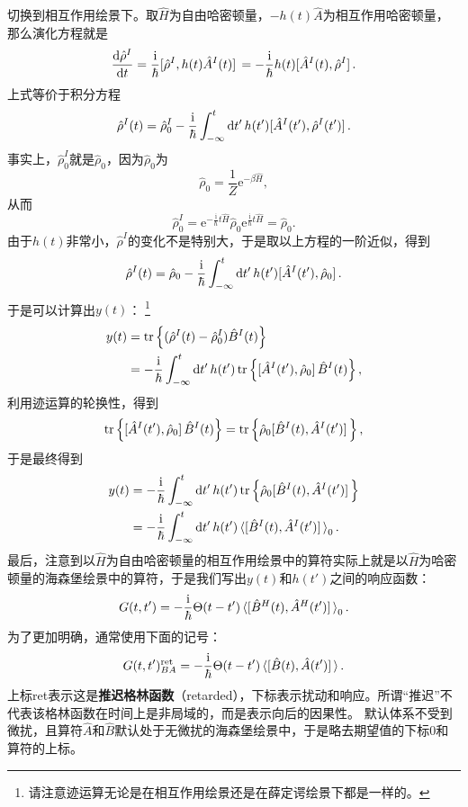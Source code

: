 \documentclass[hyperref, UTF8, a4paper]{ctexart}
\newcommand*{\ii}{\mathrm{i}}
\newcommand*{\ee}{\mathrm{e}}
\begin{document}
切换到相互作用绘景下。取$\hat{H}$为自由哈密顿量，$-h(t)\hat{A}$为相互作用哈密顿量，那么演化方程就是
\[
    \dv{\hat{\rho}^I}{t} = \frac{\ii}{\hbar} \comm*{\hat{\rho}^I}{h(t)\hat{A}^I(t)} = - \frac{\ii}{\hbar} h(t) \comm*{\hat{A}^I(t)}{\hat{\rho}^I}.
\]
上式等价于积分方程
\[
    \hat{\rho}^I(t) = \hat{\rho}_0^I - \frac{\ii}{\hbar}  \int_{-\infty}^t \dd{t'} h(t') \comm*{\hat{A}^I(t')}{\hat{\rho}^I(t')}.
\]
事实上，$\hat{\rho}_0^I$就是$\hat{\rho}_0$，因为$\hat{\rho}_0$为
\[
    \hat{\rho}_0 = \frac{1}{Z} \ee^{-\beta \hat{H}},
\]
从而
\[
    \hat{\rho}_0^I = \ee^{-\frac{\ii}{\hbar}t \hat{H}} \hat{\rho}_0 \ee^{\frac{\ii}{\hbar}t \hat{H}} = \hat{\rho}_0.
\]
由于$h(t)$非常小，$\hat{\rho}^I$的变化不是特别大，于是取以上方程的一阶近似，得到
\[
    \hat{\rho}^I(t) = \hat{\rho}_0 - \frac{\ii}{\hbar}  \int_{-\infty}^t \dd{t'} h(t') \comm*{\hat{A}^I(t')}{\hat{\rho}_0}.
\]
于是可以计算出$y(t)$：%
\footnote{请注意迹运算无论是在相互作用绘景还是在薛定谔绘景下都是一样的。}
\[
    \begin{aligned}
        y(t) &= \trace \left\{ (\hat{\rho}^I(t) - \hat{\rho}^I_0) \hat{B}^I(t) \right\} \\
        &= - \frac{\ii}{\hbar} \int_{-\infty}^t \dd{t'} h(t') \trace \left\{ \comm*{\hat{A}^I(t')}{\hat{\rho}_0} \hat{B}^I(t) \right\},
    \end{aligned}
\]
利用迹运算的轮换性，得到
\[
    \trace \left\{ \comm*{\hat{A}^I(t')}{\hat{\rho}_0} \hat{B}^I(t) \right\} = \trace \left\{ \hat{\rho}_0 \comm*{\hat{B}^I(t)}{\hat{A}^I(t')} \right\},
\]
于是最终得到
\[
    \begin{aligned}
        y(t) &= - \frac{\ii}{\hbar} \int_{-\infty}^t \dd{t'} h(t') \trace \left\{ \hat{\rho}_0 \comm*{\hat{B}^I(t)}{\hat{A}^I(t')} \right\} \\
        &= - \frac{\ii}{\hbar} \int_{-\infty}^t \dd{t'} h(t') \expval*{\comm*{\hat{B}^I(t)}{\hat{A}^I(t')} }_0.
    \end{aligned}
\]
最后，注意到以$\hat{H}$为自由哈密顿量的相互作用绘景中的算符实际上就是以$\hat{H}$为哈密顿量的海森堡绘景中的算符，于是我们写出$y(t)$和$h(t')$之间的响应函数：
\[
    G(t,t') = - \frac{\ii}{\hbar} \Theta(t-t') \expval*{\comm*{\hat{B}^H(t)}{\hat{A}^H(t')}}_0.
\]
为了更加明确，通常使用下面的记号：
\begin{equation}
    G(t,t')^\text{ret}_{BA} = - \frac{\ii}{\hbar} \Theta(t-t') \expval*{\comm*{\hat{B}(t)}{\hat{A}(t')}}.
    \label{eq:retarded-green-function}
\end{equation}
上标ret表示这是\textbf{推迟格林函数}（retarded），下标表示扰动和响应。所谓“推迟”不代表该格林函数在时间上是非局域的，而是表示向后的因果性。
默认体系不受到微扰，且算符$\hat{A}$和$\hat{B}$默认处于无微扰的海森堡绘景中，于是略去期望值的下标0和算符的上标。
\end{document}
